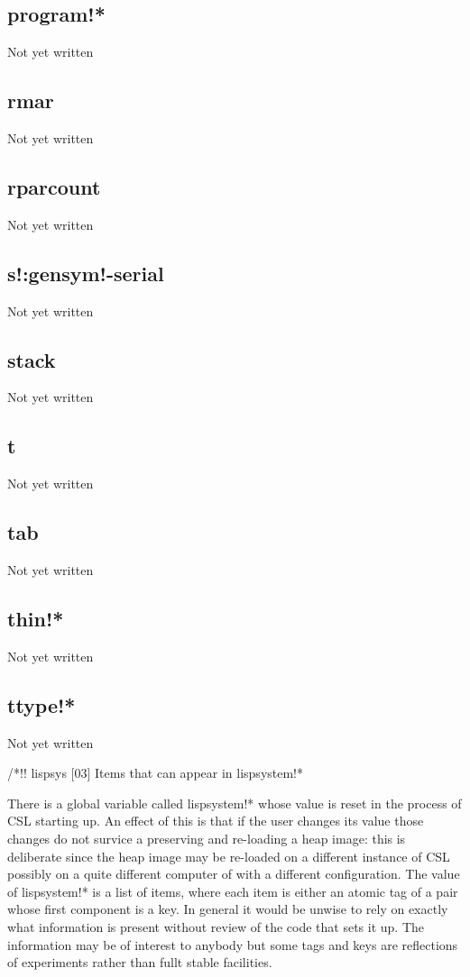 \documentclass[a4paper,11pt]{article}
\begin{document}
\subsection{\ttfamily program!*}
   Not yet written

\subsection{\ttfamily rmar}
   Not yet written

\subsection{\ttfamily rparcount}
   Not yet written

\subsection{\ttfamily s!:gensym!-serial}
   Not yet written

\subsection{\ttfamily stack}
   Not yet written

\subsection{\ttfamily t}
   Not yet written

\subsection{\ttfamily tab}
   Not yet written

\subsection{\ttfamily thin!*}
   Not yet written

\subsection{\ttfamily ttype!*}
   Not yet written

/*!! lispsys [03] Items that can appear in {\ttfamily lispsystem!*}
  
   There is a global variable called {\ttfamily lispsystem!*} whose value is
   reset in the process of CSL starting up. An effect of this is that if the
   user changes its value those changes do not survice a preserving and
   re-loading a heap image: this is deliberate since the heap image may be
   re-loaded on a different instance of CSL possibly on a quite different
   computer of with a different configuration. The value of {\ttfamily
   lispsystem!*} is a list of items, where each item is either an atomic tag
   of a pair whose first component is a key. In general it would be unwise
   to rely on exactly what information is present without review of the code
   that sets it up. The information may be of interest to anybody but some tags
   and keys are reflections of experiments rather than fullt stable facilities.
  
\end{document}
